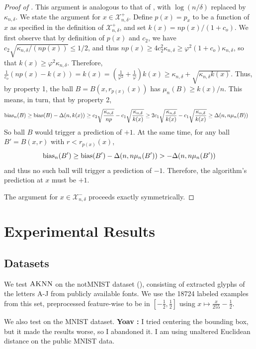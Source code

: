 \documentclass{article}
\def\X{{\mathcal X}}
\def\bias{{\rm bias}}
\newcommand{\algname}{\textsc{AKNN}}
\newcommand{\comment}[3]{{\color{#1} {\bf #2 :} #3}}
\newcommand{\yoav}[1]{\comment{green}{Yoav}{#1}}
\begin{document}
\begin{proof}[Proof of ]
This argument is analogous to that of , with $\log (n/\delta)$ replaced by $\kappa_{n, \delta}$. We state the argument for $x \in \X^+_{n,\delta}$. Define $p(x) = p_x$ to be a function of $x$ as specified in the definition of $\X^+_{n,\delta}$, and set $k(x) = np(x) / (1 + c_o)$. We first observe that by definition of $p(x)$ and $c_2$, we have $c_2 \sqrt{\kappa_{n, \delta}/(n p(x))} \leq 1/2$, and thus $np(x) \geq 4 c_2^2 \kappa_{n, \delta} \geq \varphi^2 (1+c_o) \kappa_{n, \delta}$, so that $k(x) \geq \varphi^2 \kappa_{n, \delta}$. Therefore, $\frac{1}{c_o} (np(x) - k(x)) = k(x) = \left( \frac{1}{\varphi^2} + \frac{1}{\varphi} \right) k(x) \geq \kappa_{n, \delta} + \sqrt{ \kappa_{n, \delta} k(x) }$. Thus, by property 1, the ball $B = B(x, r_{p(x)} (x))$ has $\mu_n(B) \geq k(x)/n$. This means, in turn, that by property 2, 
\begin{align*}
\bias_n(B) &\geq \bias(B) - \Delta(n, k(x) ) 
\geq c_2 \sqrt{\frac{\kappa_{n, \delta}}{np}} - c_1 \sqrt{\frac{\kappa_{n, \delta}}{k(x)}} 
\geq 2c_1 \sqrt{\frac{\kappa_{n, \delta}}{k(x)}} - c_1 \sqrt{\frac{\kappa_{n, \delta}}{k(x)}} 
\geq \Delta(n, n \mu_n(B))
\end{align*}
So ball $B$ would trigger a prediction of $+1$.
At the same time, for any ball $B' = B(x, r)$ with $r < r_{p(x)} (x)$,
$$ \bias_n(B') \geq \bias(B') - \Delta(n, n \mu_n(B')) > -\Delta(n, n \mu_n(B')) $$
and thus no such ball will trigger a prediction of $-1$. Therefore, the algorithm's prediction at $x$ must be $+1$.

The argument for $x \in \X^-_{n,\delta}$ proceeds exactly symmetrically. 
\end{proof}

\section{Experimental Results}

\subsection{Datasets}

We test $\algname$ on the notMNIST dataset (\cite{notMNIST}), consisting of extracted glyphs of the letters A-J from publicly available fonts. We use the 18724 labeled examples from this set, preprocessed feature-wise to be in $[-\frac{1}{2}, \frac{1}{2}]$ using $x \mapsto \frac{x}{255} - \frac{1}{2}$.

We also test on the MNIST dataset. \yoav{I tried centering the bounding box, but it made the results worse, so I abandoned it. I am using unaltered Euclidean distance on the public MNIST data.}
\end{document}

